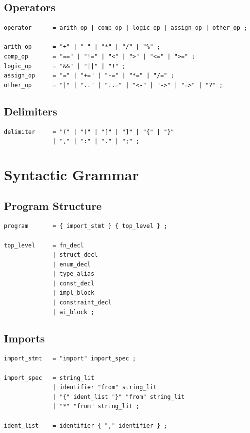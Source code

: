 \subsection{Operators}

\begin{lstlisting}[language=EBNF]
operator      = arith_op | comp_op | logic_op | assign_op | other_op ;

arith_op      = "+" | "-" | "*" | "/" | "%" ;
comp_op       = "==" | "!=" | "<" | ">" | "<=" | ">=" ;
logic_op      = "&&" | "||" | "!" ;
assign_op     = "=" | "+=" | "-=" | "*=" | "/=" ;
other_op      = "|" | ".." | "..=" | "<-" | "->" | "=>" | "?" ;
\end{lstlisting}

\subsection{Delimiters}

\begin{lstlisting}[language=EBNF]
delimiter     = "(" | ")" | "[" | "]" | "{" | "}"
              | "," | ":" | "." | ";" ;
\end{lstlisting}

\section{Syntactic Grammar}

\subsection{Program Structure}

\begin{lstlisting}[language=EBNF]
program       = { import_stmt } { top_level } ;

top_level     = fn_decl
              | struct_decl
              | enum_decl
              | type_alias
              | const_decl
              | impl_block
              | constraint_decl
              | ai_block ;
\end{lstlisting}

\subsection{Imports}

\begin{lstlisting}[language=EBNF]
import_stmt   = "import" import_spec ;

import_spec   = string_lit
              | identifier "from" string_lit
              | "{" ident_list "}" "from" string_lit
              | "*" "from" string_lit ;

ident_list    = identifier { "," identifier } ;
\end{lstlisting}

